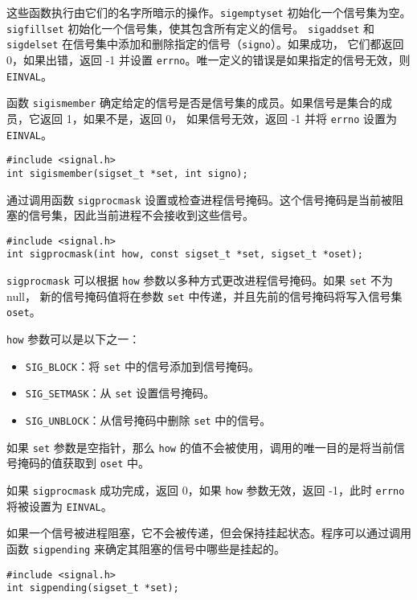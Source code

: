 \documentclass{ctexart}
\begin{document}
这些函数执行由它们的名字所暗示的操作。\texttt{sigemptyset} 初始化一个信号集为空。\texttt{sigfillset} 初始化一个信号集，使其包含所有定义的信号。
\texttt{sigaddset} 和 \texttt{sigdelset} 在信号集中添加和删除指定的信号（\texttt{signo}）。如果成功，
它们都返回 0，如果出错，返回 -1 并设置 \texttt{errno}。唯一定义的错误是如果指定的信号无效，则 \texttt{EINVAL}。  
  
函数 \texttt{sigismember} 确定给定的信号是否是信号集的成员。如果信号是集合的成员，它返回 1，如果不是，返回 0，
如果信号无效，返回 -1 并将 \texttt{errno} 设置为 \texttt{EINVAL}。  
  
\begin{verbatim}  
#include <signal.h>  
int sigismember(sigset_t *set, int signo);  
\end{verbatim}  
  
通过调用函数 \texttt{sigprocmask} 设置或检查进程信号掩码。这个信号掩码是当前被阻塞的信号集，因此当前进程不会接收到这些信号。  
  
\begin{verbatim}  
#include <signal.h>  
int sigprocmask(int how, const sigset_t *set, sigset_t *oset);  
\end{verbatim}  
  
\texttt{sigprocmask} 可以根据 \texttt{how} 参数以多种方式更改进程信号掩码。如果 \texttt{set} 不为 null，
新的信号掩码值将在参数 \texttt{set} 中传递，并且先前的信号掩码将写入信号集 \texttt{oset}。  
  
\texttt{how} 参数可以是以下之一：  
\begin{itemize}  
\item \texttt{SIG\_BLOCK}：将 \texttt{set} 中的信号添加到信号掩码。  
\item \texttt{SIG\_SETMASK}：从 \texttt{set} 设置信号掩码。  
\item \texttt{SIG\_UNBLOCK}：从信号掩码中删除 \texttt{set} 中的信号。  
\end{itemize}  
  
如果 \texttt{set} 参数是空指针，那么 \texttt{how} 的值不会被使用，调用的唯一目的是将当前信号掩码的值获取到 \texttt{oset} 中。  
  
如果 \texttt{sigprocmask} 成功完成，返回 0，如果 \texttt{how} 参数无效，返回 -1，此时 \texttt{errno} 将被设置为 \texttt{EINVAL}。  
  
如果一个信号被进程阻塞，它不会被传递，但会保持挂起状态。程序可以通过调用函数 \texttt{sigpending} 来确定其阻塞的信号中哪些是挂起的。  
  
\begin{verbatim}  
#include <signal.h>  
int sigpending(sigset_t *set);  
\end{verbatim}  
  
\end{document}

